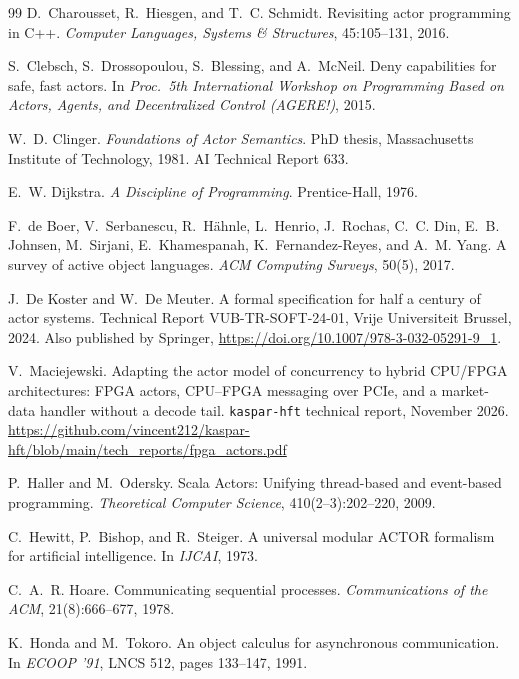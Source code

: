 \documentclass[11pt]{article}
\theoremstyle{definition}
\theoremstyle{remark}
\newcommand{\kh}{\texttt{kaspar-hft}}
\begin{document}
\begin{thebibliography}{99}
 D.~Charousset, R.~Hiesgen, and T.~C. Schmidt. Revisiting actor
programming in C++. \emph{Computer Languages, Systems \& Structures}, 45:105--131, 2016.

 S.~Clebsch, S.~Drossopoulou, S.~Blessing, and A.~McNeil. Deny
capabilities for safe, fast actors. In \emph{Proc.\ 5th International Workshop on
Programming Based on Actors, Agents, and Decentralized Control (AGERE!)}, 2015.

 W.~D. Clinger. \emph{Foundations of Actor Semantics}. PhD thesis,
Massachusetts Institute of Technology, 1981. AI Technical Report 633.

 E.~W. Dijkstra. \emph{A Discipline of Programming}. Prentice-Hall,
1976.

 F.~de Boer, V.~Serbanescu, R.~H\"ahnle, L.~Henrio, J.~Rochas,
  C.~C. Din, E.~B. Johnsen, M.~Sirjani, E.~Khamespanah, K.~Fernandez-Reyes, and A.~M.
  Yang. A survey of active object languages. \emph{ACM Computing Surveys}, 50(5), 2017.

 J.~De Koster and W.~De Meuter. A formal specification for half a
  century of actor systems. Technical Report VUB-TR-SOFT-24-01, Vrije Universiteit
  Brussel, 2024. Also published by Springer,
  \url{https://doi.org/10.1007/978-3-032-05291-9_1}.

 V.~Maciejewski. Adapting the actor model of concurrency to hybrid
CPU/FPGA architectures: FPGA actors, CPU--FPGA messaging over PCIe, and a market-data
handler without a decode tail. \kh{} technical report, November 2026.
\url{https://github.com/vincent212/kaspar-hft/blob/main/tech_reports/fpga_actors.pdf}

 P.~Haller and M.~Odersky. Scala Actors: Unifying thread-based
and event-based programming. \emph{Theoretical Computer Science}, 410(2--3):202--220, 2009.

 C.~Hewitt, P.~Bishop, and R.~Steiger. A universal modular ACTOR
  formalism for artificial intelligence. In \emph{IJCAI}, 1973.

 C.~A.~R. Hoare. Communicating sequential processes.
\emph{Communications of the ACM}, 21(8):666--677, 1978.

 K.~Honda and M.~Tokoro. An object calculus for asynchronous
  communication. In \emph{ECOOP '91}, LNCS 512, pages 133--147, 1991.


\end{thebibliography}
\end{document}
